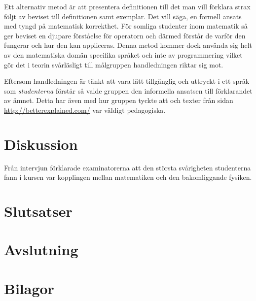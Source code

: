\documentclass[]{article}
\begin{document}
Ett alternativ metod är att presentera definitionen till det man vill förklara strax följt av beviset till definitionen samt exemplar. Det vill säga, en formell ansats med tyngd på matematisk korrekthet. För somliga studenter inom matematik så ger beviset en djupare förståelse för operatorn och därmed förstår de varför den fungerar och hur den kan appliceras. Denna metod kommer dock använda sig helt av den matematiska domän specifika språket och inte av programmering vilket gör det i teorin svårläsligt till målgruppen handledningen riktar sig mot.

Eftersom handledningen är tänkt att vara lätt tillgänglig och uttryckt i ett språk som \emph{studenterna} förstår så valde gruppen den informella ansatsen till förklarandet av ämnet. Detta har även med hur gruppen tyckte att \cite{learnyouahaskell} och texter från sidan
\url{http://betterexplained.com/} var väldigt pedagogiska.  


\section{Diskussion}




Från intervjun förklarade examinatorerna att den största svårigheten studenterna
fann i kursen var kopplingen mellan matematiken och den bakomliggande fysiken.



\section{Slutsatser}

\section{Avslutning}
%

\newpage

\printbibliography

\section{Bilagor}
\end{document}
